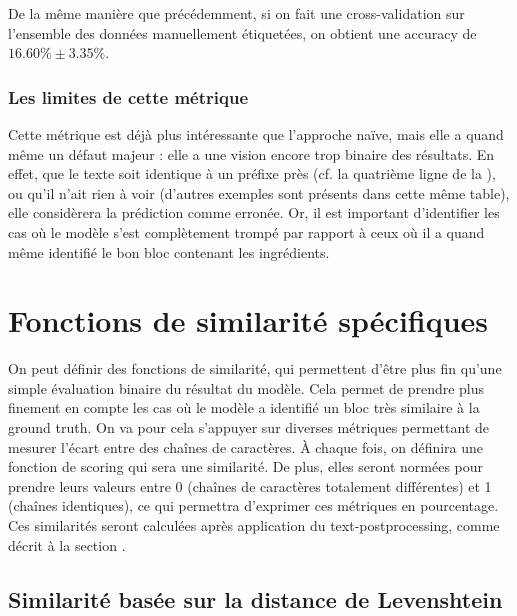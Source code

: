                 De la même manière que précédemment, si on fait une cross-validation sur l'ensemble des données manuellement étiquetées, on obtient une accuracy de $16.60\% \pm 3.35\%$.

                \subsubsection{Les limites de cette métrique}

                Cette métrique est déjà plus intéressante que l'approche naïve, mais elle a quand même un défaut majeur : elle a une vision encore trop binaire des résultats.
                En effet, que le texte soit identique à un préfixe près (cf. la quatrième ligne de la ), ou qu'il n'ait rien à voir (d'autres exemples sont présents dans cette même table), elle considèrera la prédiction comme erronée.
                Or, il est important d'identifier les cas où le modèle s'est complètement trompé par rapport à ceux où il a quand même identifié le bon bloc contenant les ingrédients.

        \section{Fonctions de \og similarité \fg spécifiques}

        On peut définir des fonctions de similarité, qui permettent d'être plus fin qu'une simple évaluation binaire du résultat du modèle.
        Cela permet de prendre plus finement en compte les cas où le modèle a identifié un bloc très similaire à la ground truth.
        On va pour cela s'appuyer sur diverses métriques permettant de mesurer l'écart entre des chaînes de caractères.
        \`{A} chaque fois, on définira une fonction de scoring qui sera une similarité.
        De plus, elles seront normées pour prendre leurs valeurs entre 0 (chaînes de caractères totalement différentes) et 1 (chaînes identiques), ce qui permettra d'exprimer ces métriques en pourcentage.
        Ces similarités seront calculées après application du text-postprocessing, comme décrit à la section .

            \subsection{Similarité basée sur la distance de Levenshtein}

